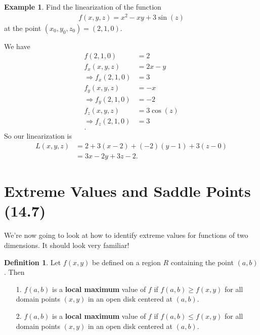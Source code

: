\documentclass[12pt, letter]{article}
\theoremstyle{plain}
\numberwithin{theorem}{section}
\theoremstyle{definition}
\newtheorem{definition}[theorem]{Definition}
\newtheorem{example}[theorem]{Example}
\begin{document}
\begin{example}
Find the linearization of the function
\begin{align*}
f(x,y,z) = x^2-xy+3\sin(z)
\end{align*}
at the point $(x_0,y_0,z_0) = (2,1,0)$.

\smallskip

We have
\begin{align*}
f(2,1,0) &= 2\\
f_x(x,y,z) &= 2x-y\\
\Rightarrow f_x(2,1,0) &= 3\\
f_y(x,y,z) &= -x\\
\Rightarrow f_y(2,1,0) &= -2\\
f_z(x,y,z) &=3\cos(z)\\
\Rightarrow f_z(2,1,0) &= 3\\.
\end{align*}
So our linearization is
\begin{align*}
L(x,y,z) &= 2+3(x-2)+(-2)(y-1)+3(z-0)\\
&= 3x-2y+3z-2.
\end{align*}
\end{example}

\newpage


\section{Extreme Values and Saddle Points (14.7)}

We're now going to look at how to identify extreme values for functions of two dimensions. It should look very familiar!

\bigskip

\begin{definition}
Let $f(x,y)$ be defined on a region $R$ containing the point $(a,b)$. Then
\begin{itemize}
\item[1.] $f(a,b)$ is a \textbf{local maximum} value of $f$ if $f(a,b) \geq f(x,y)$ for all domain points $(x,y)$ in an open disk centered at $(a,b)$.
\item[2.] $f(a,b)$ is a \textbf{local maximum} value of $f$ if $f(a,b) \leq f(x,y)$ for all domain points $(x,y)$ in an open disk centered at $(a,b)$.
\end{itemize}
\end{definition}
\end{document}
